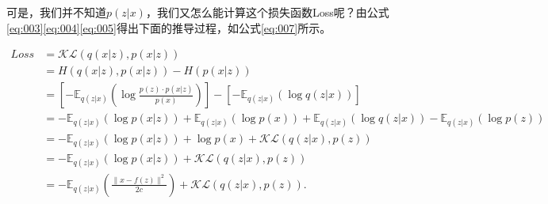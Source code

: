 \documentclass[twocolumn]{article}
\begin{document}
    可是，我们并不知道$ p(z|x) $，我们又怎么能计算这个损失函数Loss呢？由公式\eqref{eq:003}\eqref{eq:004}\eqref{eq:005}得出下面的推导过程，如公式\eqref{eq:007}所示。
\begin{strip}
\begin{equation}
    \begin{aligned}
        Loss &= \mathcal{KL}(q(x|z), p(x|z)) \\
            &= H(q(x|z), p(x|z)) - H(p(x|z)) \\
            &= \left[ -\mathbb{E}_{q(z|x)}(\log \frac{p(z)\cdot p(x|z)}{p(x)}) \right] - \left[ -\mathbb{E}_{q(z|x)}(\log q(z|x)) \right] \\
            &= - \mathbb{E}_{q(z|x)}(\log p(x|z)) + \mathbb{E}_{q(z|x)}(\log p(x)) + \mathbb{E}_{q(z|x)}(\log q(z|x)) - \mathbb{E}_{q(z|x)}(\log p(z))\\
            &= - \mathbb{E}_{q(z|x)}(\log p(x|z)) + \log p(x) + \mathcal{KL}(q(z|x), p(z)) \\
            &= - \mathbb{E}_{q(z|x)}(\log p(x|z)) + \mathcal{KL}(q(z|x), p(z)) \\
            &= - \mathbb{E}_{q(z|x)}(\frac{\lVert x-f(z) \rVert^2}{2c}) + \mathcal{KL}(q(z|x), p(z)).
    \end{aligned}    
    \label{eq:007}
\end{equation}


\end{strip}
\end{document}
